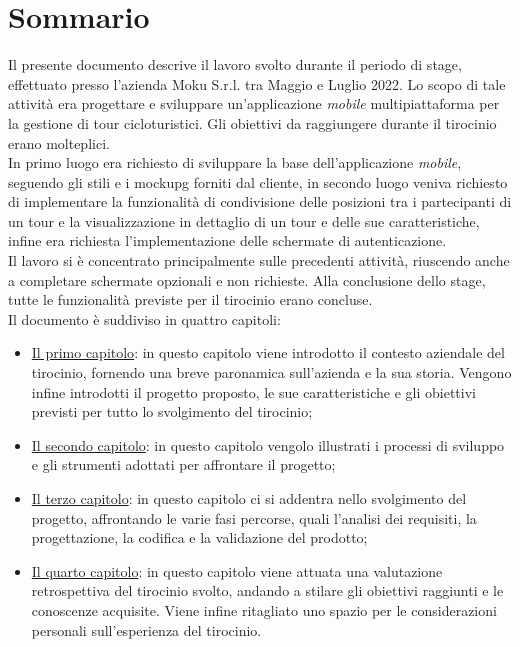 
\cleardoublepage
{}
{}
\begingroup
\let\clearpage\relax
\let\cleardoublepage\relax
\let\cleardoublepage\relax

\chapter*{Sommario}

\noindent Il presente documento descrive il lavoro svolto durante il periodo di stage, effettuato presso l'azienda Moku S.r.l. tra Maggio e Luglio 2022. Lo scopo di tale attività era progettare e sviluppare un'applicazione \textit{mobile} multipiattaforma per la gestione di tour cicloturistici. Gli obiettivi da raggiungere durante il tirocinio erano molteplici. \\

\noindent In primo luogo era richiesto di sviluppare la base dell'applicazione \textit{mobile}, seguendo gli stili e i \gls{mockupg} forniti dal cliente, in secondo luogo veniva richiesto di implementare la funzionalità di condivisione delle posizioni tra i partecipanti di un tour e la visualizzazione in dettaglio di un tour e delle sue caratteristiche, infine era richiesta l'implementazione delle schermate di autenticazione. \\

\noindent Il lavoro si è concentrato principalmente sulle precedenti attività, riuscendo anche a completare schermate opzionali e non richieste. Alla conclusione dello stage, tutte le funzionalità previste per il tirocinio erano concluse. \\

\noindent Il documento è suddiviso in quattro capitoli:
\begin{itemize}
    \item \hyperref[cap:cap1]{Il primo capitolo}: in questo capitolo viene introdotto il contesto aziendale del tirocinio, fornendo una breve paronamica sull'azienda e la sua storia. Vengono infine introdotti il progetto proposto, le sue caratteristiche e gli obiettivi previsti per tutto lo svolgimento del tirocinio;
    \item \hyperref[cap:cap2]{Il secondo capitolo}: in questo capitolo vengolo illustrati i processi di sviluppo e gli strumenti adottati per affrontare il progetto;
    \item \hyperref[cap:cap3]{Il terzo capitolo}: in questo capitolo ci si addentra nello svolgimento del progetto, affrontando le varie fasi percorse, quali l'analisi dei requisiti, la progettazione, la codifica e la validazione del prodotto;
    \item \hyperref[cap:cap4]{Il quarto capitolo}: in questo capitolo viene attuata una valutazione retrospettiva del tirocinio svolto, andando a stilare gli obiettivi raggiunti e le conoscenze acquisite. Viene infine ritagliato uno spazio per le considerazioni personali sull'esperienza del tirocinio.
\end{itemize}

